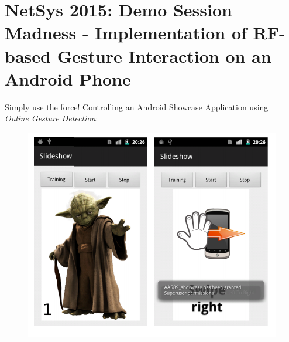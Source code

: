 \documentclass{beamer}
\begin{document}
\section{NetSys 2015: Demo Session Madness - Implementation of RF-based Gesture Interaction on an Android Phone}




\begin{frame}{Simply use the force!}
Controlling an Android Showcase Application using \\ \emph{Online Gesture Detection}:
 \begin{figure}
 \centering
\includegraphics[width=0.75\linewidth]{./pics/showcaseApp.png}
\label{fig:ushahidi}
\end{figure}
\end{frame}
\end{document}
